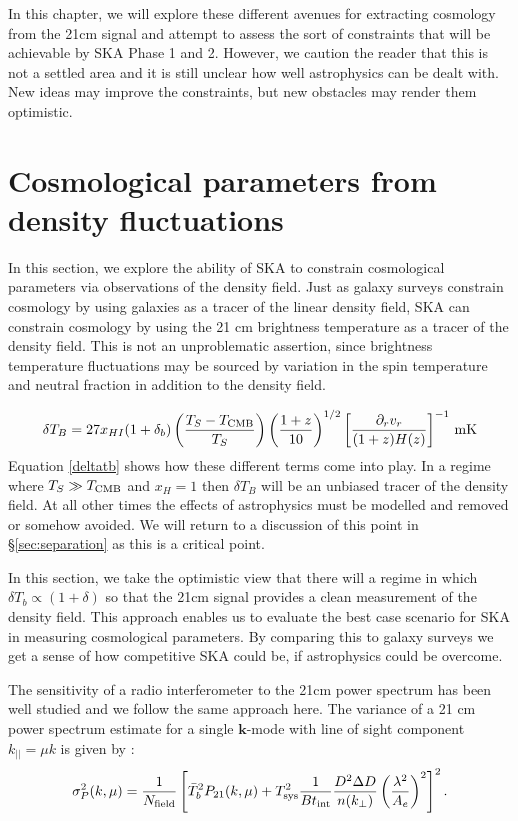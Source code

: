 \documentclass{PoS}
\begin{document}
In this chapter, we will explore these different avenues for extracting cosmology from the 21cm signal and attempt to assess the sort of constraints that will be achievable by SKA Phase 1 and 2. However, we caution the reader that this is not a settled area and it is still unclear how well astrophysics can be dealt with. New ideas may improve the constraints, but new obstacles may render them optimistic.

\section{Cosmological parameters from density fluctuations}

In this section, we explore the ability of SKA to constrain cosmological parameters via observations of the density field. Just as galaxy surveys constrain cosmology by using galaxies as a tracer of the linear density field, SKA can constrain cosmology by using the 21 cm brightness temperature as a tracer of the density field. This is not an unproblematic assertion, since brightness temperature fluctuations may be sourced by variation in the spin temperature and neutral fraction in addition to the density field. 

\begin{equation}\label{deltatb}
\delta T_B=27x_{HI}(1+\delta_b)\left(\frac{T_S-T_{\rm CMB}}{T_S}\right)\left(\frac{1+z}{10}\right)^{1/2}\left[\frac{\partial_rv_r}{(1+z)H(z)}\right]^{-1}{\rm\,mK}
\end{equation}
Equation \ref{deltatb} shows how these different terms come into play. In a regime where $T_S\gg T_{\rm CMB}$ and $x_H=1$ then $\delta T_B$ will be an unbiased tracer of the density field. At all other times the effects of astrophysics must be modelled and removed or somehow avoided. We will return to a discussion of this point in \S\ref{sec:separation} as this is a critical point.

In this section, we take the optimistic view that there will a regime in which $\delta T_b\propto(1+\delta)$ so that the 21cm signal provides a clean measurement of the density field. This approach enables us to evaluate the best case scenario for SKA in measuring cosmological parameters. By comparing this to galaxy surveys we get a sense of how competitive SKA could be, if astrophysics could be overcome.

The sensitivity of a radio interferometer to the 21cm power spectrum has been well studied \cite[e.g.][]{bowman2006, 2006ApJ...653..815M,2008PhRvD..78b3529M} and we follow the same approach here. The variance of a 21 cm power spectrum estimate for a single
$\mathbf{k}$-mode with line of sight component $k_{||}=\mu k$ is given by \citep{2008ApJ...680..962L}:
\begin{equation}
\sigma_P^2(k,\mu)= \frac{1}{N_{\rm field}}\left[\bar{T}_b^2P_{21}(k,\mu)+T_{\rm sys}^2\frac{1}{B t_{\rm int}}\frac{D^2\Delta D}{n(k_\perp)}\left(\frac{\lambda^2}{A_e}\right)^2\right]^2.
\end{equation}
\end{document}
